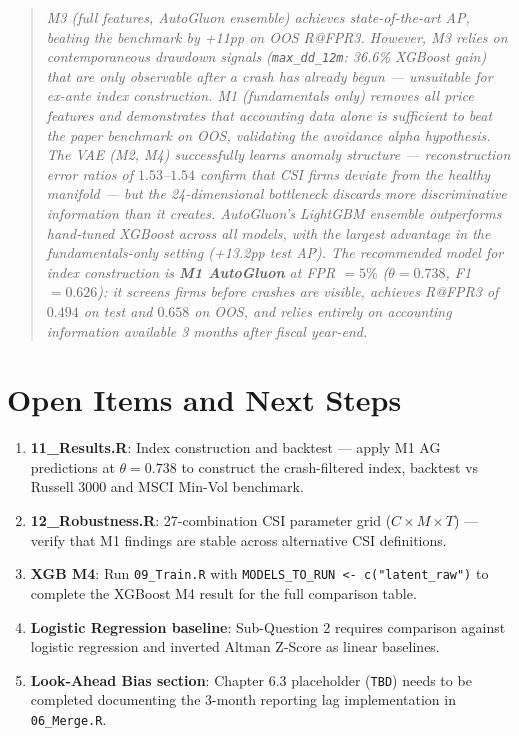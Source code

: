\documentclass{report}\usepackage[]{graphicx}\usepackage[table]{xcolor}
\begin{document}
\begin{quote}
\textit{M3 (full features, AutoGluon ensemble) achieves state-of-the-art AP, 
beating the \citet{Tewari2024} benchmark by +11pp on OOS R@FPR3. However, 
M3 relies on contemporaneous drawdown signals (\texttt{max\_dd\_12m}: 36.6\% XGBoost gain) 
that are only observable after a crash has already begun — unsuitable for ex-ante 
index construction. M1 (fundamentals only) removes all price features and demonstrates 
that accounting data alone is sufficient to beat the paper benchmark on OOS, 
validating the avoidance alpha hypothesis. The VAE (M2, M4) successfully learns 
anomaly structure — reconstruction error ratios of $1.53$--$1.54$ confirm that 
CSI firms deviate from the healthy manifold — but the 24-dimensional bottleneck 
discards more discriminative information than it creates. AutoGluon's LightGBM 
ensemble outperforms hand-tuned XGBoost across all models, with the largest 
advantage in the fundamentals-only setting (+13.2pp test AP). The recommended 
model for index construction is \textbf{M1 AutoGluon} at FPR $= 5\%$ 
($\theta = 0.738$, F1 $= 0.626$): it screens firms before crashes are visible, 
achieves R@FPR3 of $0.494$ on test and $0.658$ on OOS, and relies entirely 
on accounting information available 3 months after fiscal year-end.}
\end{quote}

\section{Open Items and Next Steps}

\begin{enumerate}
    \item \textbf{11\_Results.R}: Index construction and backtest — apply M1 AG 
    predictions at $\theta = 0.738$ to construct the crash-filtered index, 
    backtest vs Russell 3000 and MSCI Min-Vol benchmark.
    
    \item \textbf{12\_Robustness.R}: 27-combination CSI parameter grid 
    ($C \times M \times T$) — verify that M1 findings are stable across 
    alternative CSI definitions.
    
    \item \textbf{XGB M4}: Run \texttt{09\_Train.R} with 
    \texttt{MODELS\_TO\_RUN <- c("latent\_raw")} to complete the XGBoost 
    M4 result for the full comparison table.
    
    \item \textbf{Logistic Regression baseline}: Sub-Question 2 requires 
    comparison against logistic regression and inverted Altman Z-Score as 
    linear baselines.
    
    \item \textbf{Look-Ahead Bias section}: Chapter 6.3 placeholder 
    (\texttt{TBD}) needs to be completed documenting the 3-month reporting 
    lag implementation in \texttt{06\_Merge.R}.
\end{enumerate}




\end{document}
